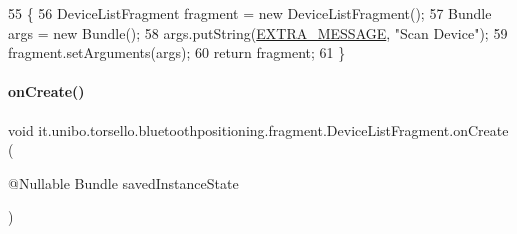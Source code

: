 \begin{DoxyCode}
55                                                    \{
56         DeviceListFragment fragment = \textcolor{keyword}{new} DeviceListFragment();
57         Bundle args = \textcolor{keyword}{new} Bundle();
58         args.putString(\hyperlink{classit_1_1unibo_1_1torsello_1_1bluetoothpositioning_1_1fragment_1_1DeviceListFragment_a6124d6f80d72149642440bb5910c2a53_a6124d6f80d72149642440bb5910c2a53}{EXTRA\_MESSAGE}, \textcolor{stringliteral}{"Scan Device"});
59         fragment.setArguments(args);
60         \textcolor{keywordflow}{return} fragment;
61     \}
\end{DoxyCode}
\hypertarget{classit_1_1unibo_1_1torsello_1_1bluetoothpositioning_1_1fragment_1_1DeviceListFragment_a6dc90ae91b0b8d10260a2d55ca193db6_a6dc90ae91b0b8d10260a2d55ca193db6}{}\label{classit_1_1unibo_1_1torsello_1_1bluetoothpositioning_1_1fragment_1_1DeviceListFragment_a6dc90ae91b0b8d10260a2d55ca193db6_a6dc90ae91b0b8d10260a2d55ca193db6} 
\paragraph{\texorpdfstring{on\+Create()}{onCreate()}}
{\footnotesize\ttfamily void it.\+unibo.\+torsello.\+bluetoothpositioning.\+fragment.\+Device\+List\+Fragment.\+on\+Create (\begin{DoxyParamCaption}\item[{@Nullable Bundle}]{saved\+Instance\+State }\end{DoxyParamCaption})}


